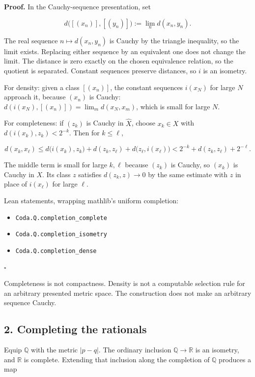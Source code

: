 \documentclass[
  11pt,
]{article}
\providecommand{\tightlist}{%
  \setlength{\itemsep}{0pt}\setlength{\parskip}{0pt}}
\begin{document}
\textbf{Proof.} In the Cauchy-sequence presentation, set

\[
d\bigl([(x_n)],[(y_n)]\bigr)
:=
\lim_n d(x_n,y_n).
\]

The real sequence \(n\mapsto d(x_n,y_n)\) is Cauchy by the triangle inequality, so the limit exists. Replacing either sequence by an equivalent one does not change the limit. The distance is zero exactly on the chosen equivalence relation, so the quotient is separated. Constant sequences preserve distances, so \(i\) is an isometry.

For density: given a class \([(x_n)]\), the constant sequences \(i(x_N)\) for large \(N\) approach it, because \((x_n)\) is Cauchy: \(d(i(x_N),[(x_n)])=\lim_m
d(x_N,x_m)\), which is small for large \(N\).

For completeness: if \((z_k)\) is Cauchy in \(\widehat{X}\), choose \(x_k\in X\) with \(d(i(x_k),z_k)<2^{-k}\). Then for \(k\le \ell\),

\[
d(x_k,x_\ell)
\le
d\bigl(i(x_k),z_k\bigr)+d(z_k,z_\ell)+d\bigl(z_\ell,i(x_\ell)\bigr)
<
2^{-k}+d(z_k,z_\ell)+2^{-\ell}.
\]

The middle term is small for large \(k,\ell\) because \((z_k)\) is Cauchy, so \((x_k)\) is Cauchy in \(X\). Its class \(z\) satisfies \(d(z_k,z)\to 0\) by the same estimate with \(z\) in place of \(i(x_\ell)\) for large \(\ell\).

Lean statements, wrapping mathlib's uniform completion:

\begin{itemize}
\tightlist
\item
  \nolinkurl{Coda.Q.completion_complete}
\item
  \nolinkurl{Coda.Q.completion_isometry}
\item
  \nolinkurl{Coda.Q.completion_dense}
\end{itemize}

\(\square\)

Completeness is not compactness. Density is not a computable selection rule for an arbitrary presented metric space. The construction does not make an arbitrary sequence Cauchy.

\subsection{2. Completing the rationals}\label{completing-the-rationals}

Equip \(\mathbb{Q}\) with the metric \(|p-q|\). The ordinary inclusion \(\mathbb{Q}\to\mathbb{R}\) is an isometry, and \(\mathbb{R}\) is complete. Extending that inclusion along the completion of \(\mathbb{Q}\) produces a map
\end{document}
